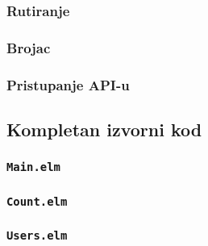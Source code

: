 \documentclass{viser-thesis}
\begin{document}
\subsubsection{Rutiranje}
\subsubsection{Brojac}
\subsubsection{Pristupanje API-u}

\subsection{Kompletan izvorni kod}

\subsubsection{\texttt{Main.elm}}


\subsubsection{\texttt{Count.elm}}


\subsubsection{\texttt{Users.elm}}


\newpage

\printindex
\newpage

\printbibliography[heading=bibintoc]
\end{document}
